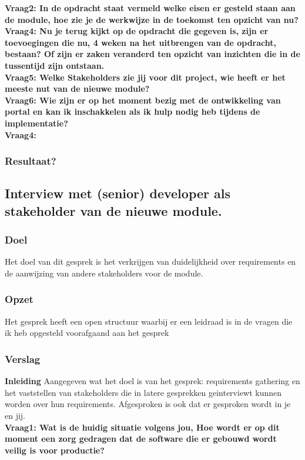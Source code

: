 \textbf{Vraag2: In de opdracht staat vermeld welke eisen er gesteld staan aan de module, hoe zie je de werkwijze in de toekomst ten opzicht van nu?}
\lipsum[03]\\

\textbf{Vraag4: Nu je terug kijkt op de opdracht die gegeven is, zijn er toevoegingen die nu, 4 weken na het uitbrengen van de opdracht, bestaan? Of zijn er zaken veranderd ten opzicht van inzichten die in de tussentijd zijn ontstaan.}
\lipsum[05]\\

\textbf{Vraag5: Welke Stakeholders zie jij voor dit project, wie heeft er het meeste nut van de nieuwe module? }
\lipsum[06]\\

\textbf{Vraag6: Wie zijn er op het moment bezig met de ontwikkeling van portal en kan ik inschakkelen als ik hulp nodig heb tijdens de implementatie?}
\lipsum[09]\\
\textbf{Vraag4: }
\lipsum[07]\\

\subsubsection{Resultaat?}


\subsection{Interview met (senior) developer als stakeholder van de nieuwe module.}
\subsubsection{Doel}
Het doel van dit gesprek is het verkrijgen van duidelijkheid over requirements en de aanwijzing van andere stakeholders voor de module.
\subsubsection{Opzet}
Het gesprek heeft een open structuur waarbij er een leidraad is in de vragen die ik heb opgesteld voorafgaand aan het gesprek
\subsubsection{Verslag}
\textbf{Inleiding}
Aangegeven wat het doel is van het gesprek: requirements gathering en het vaststellen van stakeholders die in latere gesprekken geinterviewt kunnen worden over hun requirements. Afgesproken is ook dat er gesproken wordt in je en jij.\\
\textbf{Vraag1: Wat is de huidig situatie volgens jou, Hoe wordt er op dit moment een zorg gedragen dat de software die er gebouwd wordt veilig is voor productie?}
\lipsum[01]\\

